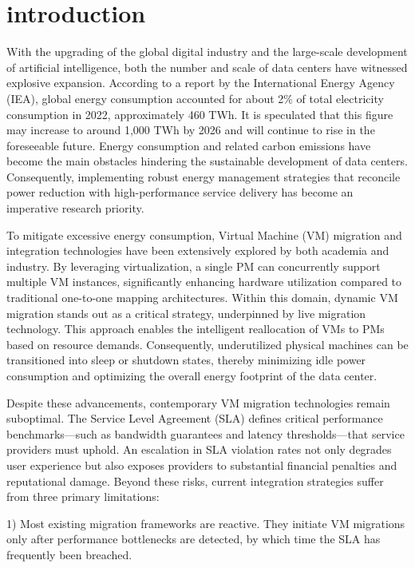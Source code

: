 \documentclass[conference]{{IEEEtran}}
\begin{document}
\section{introduction}
With the upgrading of the global digital industry and the large-scale development of artificial intelligence, both the number and scale of data centers have witnessed explosive expansion\cite{lou2025hybrid}.  According to a report by the International Energy Agency (IEA), global energy consumption accounted for about 2\% of total electricity consumption in 2022, approximately 460 TWh\cite{adegboye2024dgs}. It is speculated that this figure may increase to around 1,000 TWh by 2026 and will continue to rise in the foreseeable future. Energy consumption and related carbon emissions have become the main obstacles hindering the sustainable development of data centers\cite{torquato2025evaluation}. Consequently, implementing robust energy management strategies that reconcile power reduction with high-performance service delivery has become an imperative research priority.

To mitigate excessive energy consumption, Virtual Machine (VM) migration and integration technologies have been extensively explored by both academia and industry. By leveraging virtualization, a single PM can concurrently support multiple VM instances, significantly enhancing hardware utilization compared to traditional one-to-one mapping architectures\cite{mondal2024multi}. Within this domain, dynamic VM migration stands out as a critical strategy, underpinned by live migration technology\cite{chongdarakul2024heuristic}. This approach enables the intelligent reallocation of VMs to PMs based on resource demands. Consequently, underutilized physical machines can be transitioned into sleep or shutdown states, thereby minimizing idle power consumption and optimizing the overall energy footprint of the data center.

Despite these advancements, contemporary VM migration technologies remain suboptimal\cite{mondal2024multi}. The Service Level Agreement (SLA) defines critical performance benchmarks—such as bandwidth guarantees and latency thresholds—that service providers must uphold. An escalation in SLA violation rates not only degrades user experience but also exposes providers to substantial financial penalties and reputational damage. Beyond these risks, current integration strategies suffer from three primary limitations: 

1) Most existing migration frameworks are reactive. They initiate VM migrations only after performance bottlenecks are detected, by which time the SLA has frequently been breached. 
\end{document}

